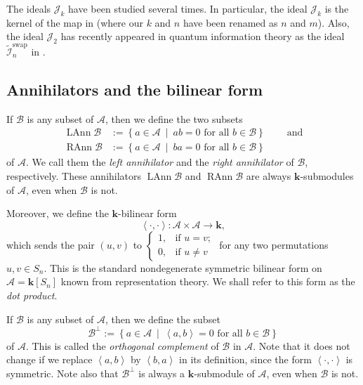 \documentclass[numbers=enddot,12pt,final,onecolumn,notitlepage]{scrartcl}%
\numberwithin{exer}{subsection}
\theoremstyle{definition}
\begin{document}
The ideals $\mathcal{J}_{k}$ have been studied several times. In particular,
the ideal $\mathcal{J}_{k}$ is the kernel of the map in \cite[Theorem
4.2]{deCPro76} (where our $k$ and $n$ have been renamed as $n$ and $m$). Also,
the ideal $\mathcal{J}_{2}$ has recently appeared in quantum information
theory as the ideal $\widetilde{\mathcal{I}}_{n}^{\operatorname*{swap}}$ in
\cite[Lemma 3.4]{BCEHK23}.

\subsection{Annihilators and the bilinear form}

If $\mathcal{B}$ is any subset of $\mathcal{A}$, then we define the two
subsets%
\begin{align*}
\operatorname*{LAnn}\mathcal{B}  &  :=\left\{  a\in\mathcal{A}\ \mid
\ ab=0\text{ for all }b\in\mathcal{B}\right\}  \ \ \ \ \ \ \ \ \ \ \text{and}%
\\
\operatorname*{RAnn}\mathcal{B}  &  :=\left\{  a\in\mathcal{A}\ \mid
\ ba=0\text{ for all }b\in\mathcal{B}\right\}
\end{align*}
of $\mathcal{A}$. We call them the \emph{left annihilator} and the \emph{right
annihilator} of $\mathcal{B}$, respectively. These annihilators
$\operatorname*{LAnn}\mathcal{B}$ and $\operatorname*{RAnn}\mathcal{B}$ are
always $\mathbf{k}$-submodules of $\mathcal{A}$, even when $\mathcal{B}$ is not.

Moreover, we define the $\mathbf{k}$-bilinear form%
\[
\left\langle \cdot,\cdot\right\rangle :\mathcal{A}\times\mathcal{A}%
\rightarrow\mathbf{k},
\]
which sends the pair $\left(  u,v\right)  $ to $%
\begin{cases}
1, & \text{if }u=v;\\
0, & \text{if }u\neq v
\end{cases}
$ for any two permutations $u,v\in S_{n}$. This is the standard nondegenerate
symmetric bilinear form on $\mathcal{A}=\mathbf{k}\left[  S_{n}\right]  $
known from representation theory. We shall refer to this form as the \emph{dot
product}.

If $\mathcal{B}$ is any subset of $\mathcal{A}$, then we define the subset%
\[
\mathcal{B}^{\perp}:=\left\{  a\in\mathcal{A}\ \mid\ \left\langle
a,b\right\rangle =0\text{ for all }b\in\mathcal{B}\right\}
\]
of $\mathcal{A}$. This is called the \emph{orthogonal complement} of
$\mathcal{B}$ in $\mathcal{A}$. Note that it does not change if we replace
$\left\langle a,b\right\rangle $ by $\left\langle b,a\right\rangle $ in its
definition, since the form $\left\langle \cdot,\cdot\right\rangle $ is
symmetric. Note also that $\mathcal{B}^{\perp}$ is always a $\mathbf{k}%
$-submodule of $\mathcal{A}$, even when $\mathcal{B}$ is not.
\end{document}
